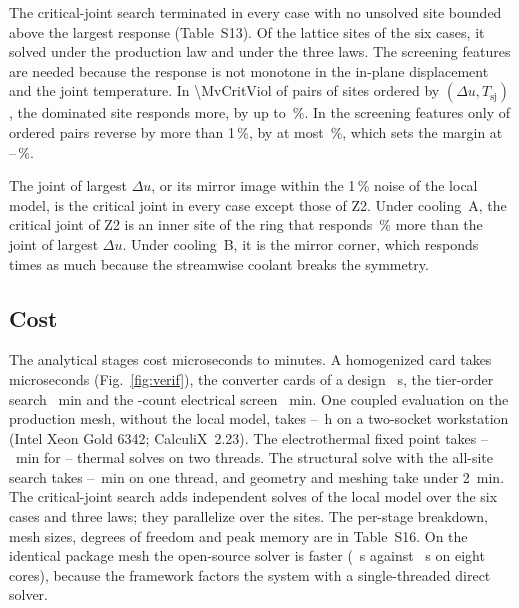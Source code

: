 The critical-joint search terminated in every case with no unsolved site bounded above the
largest response (Table~S13). Of the \MvCritLattice{} lattice sites of the six cases, it solved
\MvCritSchubSolved{} under the production law and \MvCritSolvedAll{} under the three laws. The
screening features are needed because the response is not monotone in the in-plane displacement
and the joint temperature. In \num[group-separator={,}]{\MvCritViol} of \MvCritPairs{} pairs of
sites ordered by $(\Delta u, T_{\mathrm{sj}})$, the dominated site responds more, by up to
\MvCritViolMax\,\%. In the screening features only \MvCritViolF{} of \MvCritPairsF{} ordered
pairs reverse by more than 1\,\%, by at most \MvCritRevF\,\%, which sets the margin at
\MvCritMarginMin--\MvCritMargin\,\%.

The joint of largest $\Delta u$, or its mirror image within the 1\,\% noise of the local model, is
the critical joint in every case except those of Z2. Under cooling~A, the critical joint of Z2 is
an inner site of the ring that responds \MvCritRatioMax\,\% more than the joint of largest
$\Delta u$. Under cooling~B, it is the mirror corner, which responds \MvCritRatioBZtwo{} times as
much because the streamwise coolant breaks the symmetry.



\subsection{Cost}
The analytical stages cost microseconds to minutes. A homogenized card takes microseconds
(Fig.~\ref{fig:verif}), the converter cards of a design \MthCardsSec~s, the tier-order search
\MthTierOrderMin~min and the \FrDseNcounts-count electrical screen \MthDseMin~min. One coupled
evaluation on the production mesh, without the local model, takes \MthTotHLo--\MthTotHHi~h on a two-socket
workstation (Intel Xeon Gold 6342; CalculiX~2.23). The electrothermal fixed point takes
\MthEtMinLo--\MthEtMinHi~min for \MthEtItersLo--\MthEtItersHi{} thermal solves on two threads.
The structural solve with the all-site search takes \MthMechMinLo--\MthMechMinHi~min on one
thread, and geometry and meshing take under 2~min. The critical-joint search adds
\MvCritSolvedAll{} independent solves of the local model over the six cases and three laws; they
parallelize over the sites. The per-stage breakdown, mesh sizes, degrees of freedom and peak
memory are in Table~S16. On the identical package mesh the open-source solver is faster (\FullPkgMooseZone~s
against \FullPkgCcxZone~s on eight cores), because the framework factors the system with a
single-threaded direct solver.
